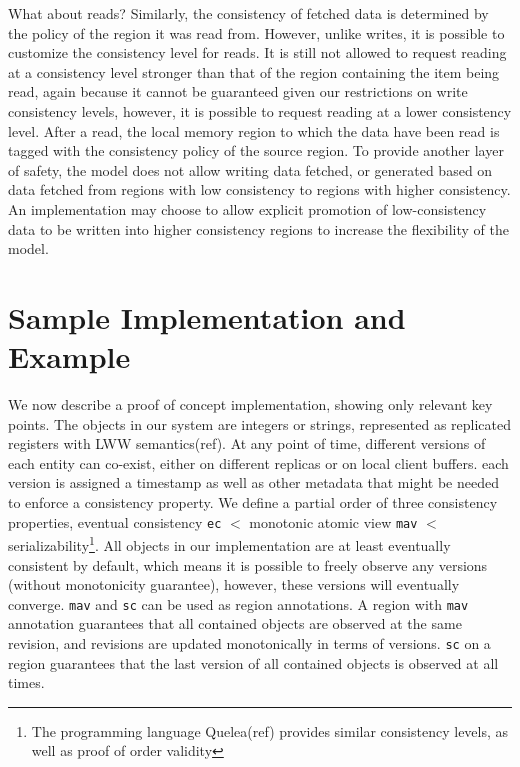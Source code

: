 \documentclass[preprint, numbers]{sigplanconf}
\begin{document}
What about reads? Similarly, the consistency of fetched data is determined by the
policy of the region it was read from. However, unlike writes, it is possible to
customize the consistency level for reads. It is still not allowed to request reading
at a consistency level stronger than that of the region containing the item
being read, again because it cannot be guaranteed given our restrictions on
write consistency levels, however, it is possible to
request reading at a lower consistency level. After a read, the local memory
region to which the data have been read is tagged with the consistency policy of
the source region. To provide another layer of safety, the model does not allow
writing data fetched, or generated based on data fetched from regions with low
consistency to regions with higher consistency. An implementation may choose to
allow explicit promotion of low-consistency data to be written into higher
consistency regions to increase the flexibility of the model.

%


\section{Sample Implementation and Example}
We now describe a proof of concept implementation, showing only
relevant key points. The objects in our system are integers or strings, represented as replicated registers with LWW
semantics(ref). At any point of time, different versions of each entity can
co-exist, either on different replicas or on local client buffers. each version
is assigned a timestamp as well as other metadata that might be needed to
enforce a consistency property. We define a partial order of three consistency properties, eventual
consistency \texttt{ec} $<$ monotonic atomic view \texttt{mav} $<$
serializability\footnote{The programming language Quelea(ref) provides similar
  consistency levels, as well as proof of order validity}. All
objects in our implementation are at least eventually consistent by default, which means it
is possible to freely observe any versions (without monotonicity guarantee),
however, these versions will eventually converge. \texttt{mav} and \texttt{sc}
can be used as region annotations. A region with \texttt{mav} annotation guarantees that all contained objects
are observed at the same revision, and revisions are updated monotonically in
terms of versions. \texttt{sc} on a region guarantees that the last version of all
contained objects is observed at all times. 
\end{document}
